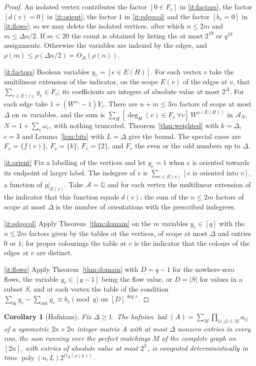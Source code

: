 \documentclass[11pt,reqno]{amsart}
\numberwithin{equation}{section}
\theoremstyle{plain}
\newtheorem{corollary}[theorem]{Corollary}
\theoremstyle{definition}
\theoremstyle{remark}
\DeclareMathOperator{\poly}{poly}
\newcommand{\A}{\mathcal{A}}
\newcommand{\Q}{\mathbb{Q}}
\newcommand{\rhon}{\rho}
\begin{document}
\begin{proof}
An isolated vertex contributes the factor $[0\in F_v]$ in \ref{it:factors},
the factor $[d(v)=0]$ in \ref{it:orient}, the factor $1$ in \ref{it:edgecol} and
the factor $[b_v=0]$ in \ref{it:flows}; so we may delete the isolated vertices,
after which $n\le 2m$ and $m\le\Delta n/2$. If $m<20$ the count is obtained by
listing the at most $2^{19}$ or $q^{19}$ assignments. Otherwise the variables are
indexed by the edges, and $\rhon(m)\le\rhon(\Delta n/2)=O_\Delta(\rhon(n))$.

\ref{it:factors} Boolean variables $y_e=[e\in E(H)]$. For each vertex $v$ take
the multilinear extension of the indicator, on the scope $E(v)$ of the edges at
$v$, that $\sum_{e\in E(v)}y_e\in F_v$; its coefficients are integers of absolute
value at most $2^{\Delta}$. For each edge take $1+(W^{\omega_e}-1)Y_e$. There are
$n+m\le 3m$ factors of scope at most $\Delta$ on $m$ variables, and the sum is
$\sum_H[\deg_H(v)\in F_v\ \forall v]\,W^{\omega(E(H))}$ in $\A_N$,
$N=1+\sum_e\omega_e$, with nothing truncated. Theorem~\ref{thm:weighted} with
$k=\Delta$, $c=3$ and Lemma~\ref{lem:bits} with $L=\Delta$ give the bound. The
special cases are $F_v=\{f(v)\}$, $F_v=\{k\}$, $F_v=\{2\}$, and $F_v$ the even or
the odd numbers up to $\Delta$.

\ref{it:orient} Fix a labelling of the vertices and let $y_e=1$ when $e$ is
oriented towards its endpoint of larger label. The indegree of $v$ is
$\sum_{e\in E(v)}[\text{$e$ is oriented into $v$}]$, a function of $y|_{E(v)}$.
Take $\A=\Q$ and for each vertex the multilinear extension of the indicator
that this function equals $d(v)$; the sum of the $n\le 2m$ factors of scope at
most $\Delta$ is the number of orientations with the prescribed indegrees.

\ref{it:edgecol} Apply Theorem~\ref{thm:domain} on the $m$ variables
$y_e\in[q]$ with the $n\le 2m$ factors given by the tables at the vertices, of
scope at most $\Delta$ and entries $0$ or $1$; for proper colourings the table
at $v$ is the indicator that the colours of the edges at $v$ are distinct.

\ref{it:flows} Apply Theorem~\ref{thm:domain} with $D=q-1$ for the nowhere-zero
flows, the variable $y_e\in[q-1]$ being the flow value, or $D=|S|$ for values in
a subset $S$, and at each vertex the table of the condition
$\sum_{\text{in}}y_e-\sum_{\text{out}}y_e\equiv b_v\pmod q$ on $[D]^{\deg v}$.
\end{proof}

\begin{corollary}[Hafnians]\label{cor:hafnian}
Fix $\Delta\ge1$. The hafnian
$\operatorname{haf}(A)=\sum_{M}\prod_{\{i,j\}\in M}a_{ij}$ of a symmetric
$2n\times 2n$ integer matrix $A$ with at most $\Delta$ nonzero entries in every
row, the sum running over the perfect matchings $M$ of the complete graph on
$[2n]$, with entries of absolute value at most $2^L$, is computed
deterministically in time $\poly(n,L)2^{O_\Delta(\rhon(n))}$.
\end{corollary}
\end{document}
